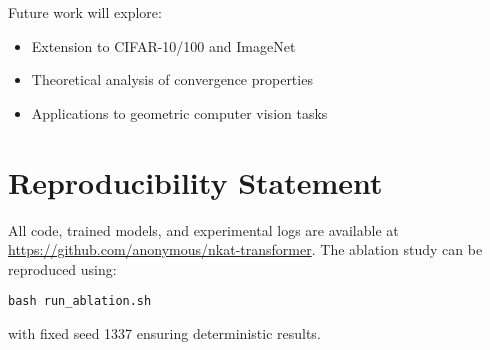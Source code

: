 \documentclass[10pt,twocolumn,letterpaper]{article}
\begin{document}
Future work will explore:
\begin{itemize}
    \item Extension to CIFAR-10/100 and ImageNet
    \item Theoretical analysis of convergence properties
    \item Applications to geometric computer vision tasks
\end{itemize}

\section{Reproducibility Statement}

All code, trained models, and experimental logs are available at \url{https://github.com/anonymous/nkat-transformer}. The ablation study can be reproduced using:

\begin{verbatim}
bash run_ablation.sh
\end{verbatim}

with fixed seed 1337 ensuring deterministic results.



\end{document}
